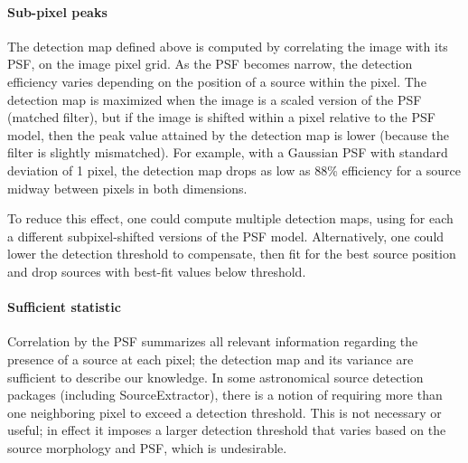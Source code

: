 \documentclass[letterpaper,preprint]{aastex62}
\newcommand{\doctype}{paper}
\begin{document}



\paragraph{Sub-pixel peaks}  The detection map defined above
is computed by correlating the image with its PSF, on the image pixel
grid.  As the PSF becomes narrow, the detection efficiency varies
depending on the position of a source within the pixel.  The detection
map is maximized when the image is a scaled version of the PSF
(matched filter), but if the image is shifted within a pixel relative
to the PSF model, then the peak value attained by the detection map is
lower (because the filter is slightly mismatched).  For example, with
a Gaussian PSF with standard deviation of 1 pixel, the detection map
drops as low as 88\% efficiency for a source midway between pixels in
both dimensions.

To reduce this effect, one could compute multiple detection maps,
using for each a different subpixel-shifted versions of the PSF model.
Alternatively, one could lower the detection threshold to compensate,
then fit for the best source position and drop sources with best-fit
values below threshold.


\paragraph{Sufficient statistic}  Correlation by the PSF summarizes
all relevant information regarding the presence of a source at each
pixel; the detection map and its variance are sufficient to describe
our knowledge.  In some astronomical source detection packages
(including SourceExtractor), there is a notion of requiring more than
one neighboring pixel to exceed a detection threshold.  This is not
necessary or useful; in effect it imposes a larger detection threshold
that varies based on the source morphology and PSF, which is
undesirable.


\end{document}
